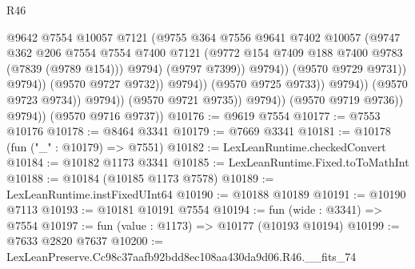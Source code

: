 \begin{lexlean}{R46}
\begin{coremodule}
                                              @9642
                                              @7554
                                              @10057
                                              @7121
                                              (@9755
                                                @364
                                                @7556
                                                @9641
                                                @7402
                                                @10057
                                                (@9747
                                                  @362
                                                  @206
                                                  @7554
                                                  @7554
                                                  @7400
                                                  @7121
                                                  (@9772
                                                    @154
                                                    @7409
                                                    @188
                                                    @7400
                                                    @9783
                                                    (@7839 (@9789 @154)))
                                                  @9794)
                                                (@9797 @7399))
                                              @9794))
                                          (@9570 @9729 @9731))
                                        @9794))
                                    (@9570 @9727 @9732))
                                  @9794))
                              (@9570 @9725 @9733))
                            @9794))
                        (@9570 @9723 @9734))
                      @9794))
                  (@9570 @9721 @9735))
                @9794))
            (@9570 @9719 @9736))
          @9794))
      (@9570 @9716 @9737))
@10176 := @9619 @7554
@10177 := @7553 @10176
@10178 := @8464 @3341
@10179 := @7669 @3341
@10181 := @10178 (fun ("_" : @10179) => @7551)
@10182 := LexLeanRuntime.checkedConvert
@10184 := @10182 @1173 @3341
@10185 := LexLeanRuntime.Fixed.toToMathInt
@10188 := @10184 (@10185 @1173 @7578)
@10189 := LexLeanRuntime.instFixedUInt64
@10190 := @10188 @10189
@10191 := @10190 @7113
@10193 := @10181 @10191 @7554
@10194 := fun (wide : @3341) => @7554
@10197 := fun (value : @1173) => @10177 (@10193 @10194)
@10199 := @7633 @2820 @7637
@10200 := LexLeanPreserve.Cc98c37aafb92bdd8ec108aa430da9d06.R46.__fits_74

\end{coremodule}
\end{lexlean}
